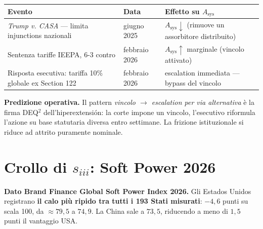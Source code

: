 {\def\LTcaptype{none} %
{\small\begin{longtable}[]{@{}
  >{\raggedright\arraybackslash}p{}
  >{\raggedright\arraybackslash}p{}
  >{\raggedright\arraybackslash}p{}@{}}
\toprule\noalign{}
\begin{minipage}[b]{\linewidth}\raggedright
Evento
\end{minipage} & \begin{minipage}[b]{\linewidth}\raggedright
Data
\end{minipage} & \begin{minipage}[b]{\linewidth}\raggedright
Effetto su \(A_{\text{sys}}\)
\end{minipage} \\
\midrule\noalign{}
\endhead
\bottomrule\noalign{}
\endlastfoot
\emph{Trump v. CASA} --- limita injunctions nazionali & 27 giugno 2025 &
\(A_{\text{sys}} \downarrow\) (rimuove un assorbitore distribuito) \\
Sentenza tariffe IEEPA, 6-3 contro & 20 febbraio 2026 &
\(A_{\text{sys}} \uparrow\) marginale (vincolo attivato) \\
Risposta esecutiva: tariffa 10\% globale ex Section 122 & febbraio 2026
& escalation immediata --- bypass del vincolo \\
\end{longtable}}
}

\Conj{} \textbf{Predizione operativa.} Il pattern \emph{vincolo \(\to\)
escalation per via alternativa} è la firma DEQ$^2$ dell'hiperextensión: la
corte impone un vincolo, l'esecutivo riformula l'azione su base
statutaria diversa entro settimane. La frizione istituzionale si riduce
ad attrito puramente nominale.



\section{\texorpdfstring{Crollo di \(s_{iii}\): Soft Power
2026}{Crollo di s\_\{iii\}: Soft Power 2026}}\label{crollo-di-s_iii-soft-power-2026}

\Proved{} \textbf{Dato Brand Finance Global Soft Power Index 2026.} Gli
Estados Unidos registrano \textbf{il calo più ripido tra tutti i 193 Stati
misurati}: \(-4{,}6\) punti su scala 100, da \(\approx 79{,}5\) a
\(74{,}9\). La China sale a \(73{,}5\), riducendo a meno di \(1{,}5\)
punti il vantaggio USA.

